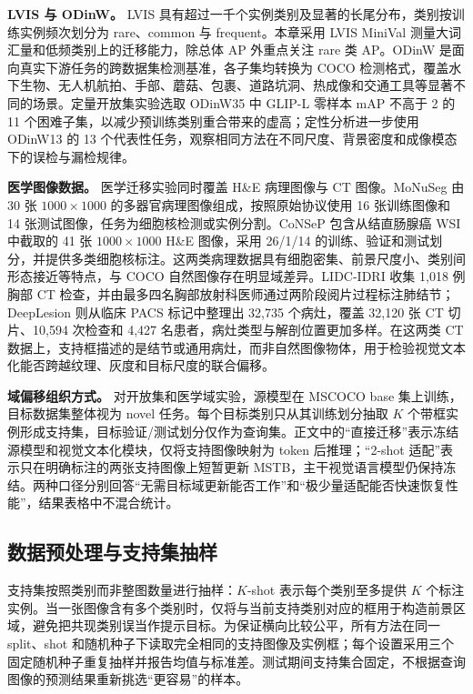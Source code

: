 \textbf{LVIS 与 ODinW。} LVIS 具有超过一千个实例类别及显著的长尾分布，类别按训练实例频次划分为 rare、common 与 frequent\cite{gupta2019lvis}。本章采用 LVIS MiniVal 测量大词汇量和低频类别上的迁移能力，除总体 AP 外重点关注 rare 类 AP。ODinW 是面向真实下游任务的跨数据集检测基准，各子集均转换为 COCO 检测格式，覆盖水下生物、无人机航拍、手部、蘑菇、包裹、道路坑洞、热成像和交通工具等显著不同的场景\cite{li2022odinw}。定量开放集实验选取 ODinW35 中 GLIP-L 零样本 mAP 不高于 2 的 11 个困难子集，以减少预训练类别重合带来的虚高；定性分析进一步使用 ODinW13 的 13 个代表性任务，观察相同方法在不同尺度、背景密度和成像模态下的误检与漏检规律。

\textbf{医学图像数据。} 医学迁移实验同时覆盖 H\&E 病理图像与 CT 图像。MoNuSeg 由 30 张 $1000\times1000$ 的多器官病理图像组成，按照原始协议使用 16 张训练图像和 14 张测试图像，任务为细胞核检测或实例分割\cite{kumar2017dataset}。CoNSeP 包含从结直肠腺癌 WSI 中截取的 41 张 $1000\times1000$ H\&E 图像，采用 26/1/14 的训练、验证和测试划分，并提供多类细胞核标注\cite{graham2019hover}。这两类病理数据具有细胞密集、前景尺度小、类别间形态接近等特点，与 COCO 自然图像存在明显域差异。LIDC-IDRI 收集 1,018 例胸部 CT 检查，并由最多四名胸部放射科医师通过两阶段阅片过程标注肺结节\cite{armato2004lungLIDC}；DeepLesion 则从临床 PACS 标记中整理出 32,735 个病灶，覆盖 32,120 张 CT 切片、10,594 次检查和 4,427 名患者，病灶类型与解剖位置更加多样\cite{yan2017deeplesion}。在这两类 CT 数据上，支持框描述的是结节或通用病灶，而非自然图像物体，用于检验视觉文本化能否跨越纹理、灰度和目标尺度的联合偏移。

\textbf{域偏移组织方式。} 对开放集和医学域实验，源模型在 MSCOCO base 集上训练，目标数据集整体视为 novel 任务。每个目标类别只从其训练划分抽取 $K$ 个带框实例形成支持集，目标验证/测试划分仅作为查询集。正文中的“直接迁移”表示冻结源模型和视觉文本化模块，仅将支持图像映射为 token 后推理；“2-shot 适配”表示只在明确标注的两张支持图像上短暂更新 MSTB，主干视觉语言模型仍保持冻结。两种口径分别回答“无需目标域更新能否工作”和“极少量适配能否快速恢复性能”，结果表格中不混合统计。

\subsection{数据预处理与支持集抽样}
支持集按照类别而非整图数量进行抽样：$K$-shot 表示每个类别至多提供 $K$ 个标注实例。当一张图像含有多个类别时，仅将与当前支持类别对应的框用于构造前景区域，避免把共现类别误当作提示目标。为保证横向比较公平，所有方法在同一 split、shot 和随机种子下读取完全相同的支持图像及实例框；每个设置采用三个固定随机种子重复抽样并报告均值与标准差。测试期间支持集合固定，不根据查询图像的预测结果重新挑选“更容易”的样本。

